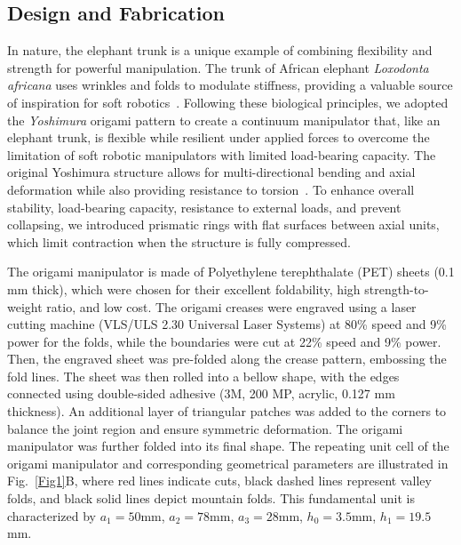 \documentclass[journal, letterpaper]{IEEEtran}
\begin{document}
\subsection{Design and Fabrication}
In nature, the elephant trunk is a unique example of combining flexibility and strength for powerful manipulation. The trunk of African elephant \textit{Loxodonta africana} uses wrinkles and folds to modulate stiffness, providing a valuable source of inspiration for soft robotics~\cite{schulz2022skin,schulz2024elephants}.
Following these biological principles, we adopted the \textit{Yoshimura} origami pattern to create a continuum manipulator that, like an elephant trunk, is flexible while resilient under applied forces to overcome the limitation of soft robotic manipulators with limited load-bearing capacity.
The original Yoshimura structure allows for multi-directional bending and axial deformation while also providing resistance to torsion~\cite{santoso2021origami}.
To enhance overall stability, load-bearing capacity, resistance to external loads, and prevent collapsing, we introduced prismatic rings with flat surfaces between axial units, which limit contraction when the structure is fully compressed. 

The origami manipulator is made of Polyethylene terephthalate (PET) sheets (0.1 mm thick), which were chosen for their excellent foldability, high strength-to-weight ratio, and low cost. The origami creases were engraved using a laser cutting machine (VLS/ULS 2.30 Universal Laser Systems) at 80\% speed and 9\% power for the folds, while the boundaries were cut at 22\% speed and 9\% power.
Then, the engraved sheet was pre-folded along the crease pattern, embossing the fold lines. The sheet was then rolled into a bellow shape, with the edges connected using double-sided adhesive (3M, 200 MP, acrylic, 0.127 mm thickness). An additional layer of triangular patches was added to the corners to balance the joint region and ensure symmetric deformation. The origami manipulator was further folded into its final shape. 
The repeating unit cell of the origami manipulator and corresponding geometrical parameters are illustrated in Fig.~\ref{Fig1}B, where red lines indicate cuts, black dashed lines represent valley folds, and black solid lines depict mountain folds. This fundamental unit is characterized by $a_1=50$\;mm, $a_2=78$\;mm, $a_3=28$\;mm, $h_0=3.5$\;mm, $h_1=19.5$\;mm. 
\end{document}

